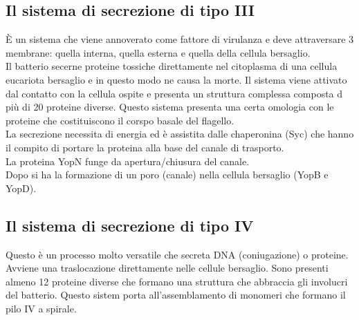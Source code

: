 \subsection{Il sistema di secrezione di tipo III}
\`E un sistema che viene annoverato come fattore di virulanza e deve attraversare 3 membrane: quella interna, quella esterna e quella della cellula bersaglio.
\\Il batterio secerne proteine tossiche direttamente nel citoplasma di una cellula eucariota bersaglio e in questo modo ne causa la morte. Il sistema viene attivato dal contatto con la cellula ospite e presenta un struttura complessa composta d pi\`u di 20 proteine diverse. Questo sistema presenta una certa omologia con le proteine che costituiscono il corspo basale del flagello. 
\\La secrezione necessita di energia ed \`e assistita dalle chaperonina (Syc) che hanno il compito di portare la proteina alla base del canale di trasporto. 
\\La proteina YopN funge da apertura/chiusura del canale. 
\\Dopo si ha la formazione di un poro (canale) nella cellula bersaglio (YopB e YopD). 
\subsection{Il sistema di secrezione di tipo IV}
Questo \`e un processo molto versatile che secreta DNA (coniugazione) o proteine. 
\\Avviene una traslocazione direttamente nelle cellule bersaglio. Sono presenti almeno 12 proteine diverse che formano una struttura che abbraccia gli involucri del batterio. Questo sistem porta all'assemblamento di monomeri che formano il pilo IV a spirale. 
